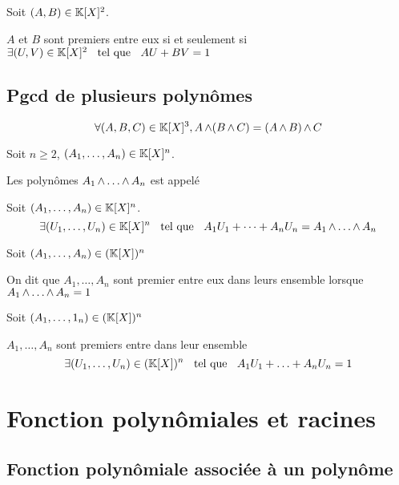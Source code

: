 \begin{thm}[Bézout]
  Soit $(A, B) \in \mathbb{K}[X]^2$.

  $A$ et $B$ sont premiers entre eux si et seulement si
  $\exists (U, V) \in \mathbb{K}[X]^2 \;\;\text{ tel que }\;\; A U + B V = 1$
\end{thm}

\subsection{Pgcd de plusieurs polynômes}

\begin{prp}
  \[
    \forall (A, B, C) \in \mathbb{K}[X]^3, A \operatorname{\wedge} (B \operatorname{\wedge} C) = (A \operatorname{\wedge} B) \operatorname{\wedge} C
  \]
\end{prp}

\begin{dfn}
  Soit $n \geq 2$, $(A_1, \ldots, A_n) \in \mathbb{K}[X]^n$.

  Les polynômes $A_1 \operatorname{\wedge} \ldots \operatorname{\wedge} A_n$ est appelé
\end{dfn}

\begin{prp}
  Soit $(A_1, \ldots, A_n) \in \mathbb{K}[X]^n$.
  \[
    \exists (U_1, \ldots, U_n) \in \mathbb{K}[X]^n \;\;\text{ tel que }\;\; A_1 U_1 + \cdots + A_n U_n
    = A_1 \operatorname{\wedge} \ldots \operatorname{\wedge} A_n
  \]
\end{prp}

\begin{dfn}
Soit $(A_1, \ldots, A_n) \in (\mathbb{K}[X])^n$ 

On dit que $A_1, \ldots, A_n$ sont premier entre eux dans leurs
ensemble lorsque $A_1 \operatorname{\wedge} \ldots \operatorname{\wedge} A_n = 1$
\end{dfn}

\begin{thm}[Bézout]
Soit $(A_1, \ldots, 1_n) \in (\mathbb{K}[X])^n$

$A_1, \ldots, A_n$ sont premiers entre dans leur ensemble \ssi
\[
    \exists (U_1, \ldots, U_n) \in (\mathbb{K}[X])^n \;\;\text{ tel que }\;\;
    A_1 U_1 + \ldots + A_n U_n = 1
\]
\end{thm}

\section{Fonction polynômiales et racines}

\subsection{Fonction polynômiale associée à un polynôme}

